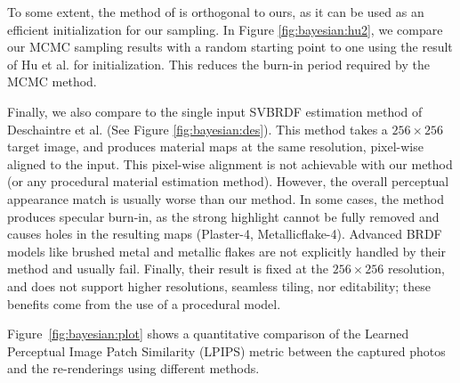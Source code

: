 

To some extent, the method of \cite{hu2019novel} is orthogonal to ours, as it can be used as an efficient initialization for our sampling. In Figure \ref{fig:bayesian:hu2}, we compare our MCMC sampling results with a random starting point to one using the result of Hu et al. for initialization. This reduces the burn-in period required by the MCMC method.



Finally, we also compare to the single input SVBRDF estimation method of Deschaintre et al. \cite{deschaintre2018single} (See Figure \ref{fig:bayesian:des}). This method takes a $256 \times 256$ target image, and produces material maps at the same resolution, pixel-wise aligned to the input. This pixel-wise alignment is not achievable with our method (or any procedural material estimation method). However, the overall perceptual appearance match is usually worse than our method. In some cases, the method produces specular burn-in, as the strong highlight cannot be fully removed and causes holes in the resulting maps (Plaster-4, Metallicflake-4). Advanced BRDF models like brushed metal and metallic flakes are not explicitly handled by their method and usually fail. Finally, their result is fixed at the $256 \times 256$ resolution, and does not support higher resolutions, seamless tiling, nor editability; these benefits come from the use of a procedural model.

Figure~\ref{fig:bayesian:plot} shows a quantitative comparison of the Learned Perceptual Image Patch Similarity (LPIPS) metric \cite{zhang2018unreasonable} between the captured photos and the re-renderings using different methods.


